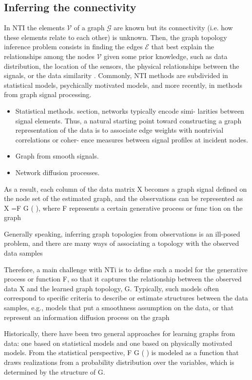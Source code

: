 \subsection{Inferring the connectivity}
\TODO
In NTI the elements $\mathcal{V}$ of a graph $\mathcal{G}$ are known but its connectivity (i.e. how these elements relate to each other) is unknown. Then, the graph topology inference problem consists in finding the edges $\mathcal{E}$ that best explain the relationships among the nodes $\mathcal{V}$ given some prior knowledge, such as  data distribution, the location of the sensors, the physical relationships between the signals, or the data similarity \cite{Dong2019Learninggraphsdata,Stankovic2019Introductiongraphsignal}. Commonly, NTI methods are subdivided in statistical models, psychically motivated models, and more recently, in methods from graph signal processing.  
\begin{itemize}
	\item Statistical methods. section, networks typically encode simi-
	larities between signal elements. Thus, a natural starting point
	toward constructing a graph representation of the data is to
	associate edge weights with nontrivial correlations or coher-
	ence measures between signal profiles at incident nodes. 
	\item Graph from smooth signals.
	\item Network diffusion processes.
\end{itemize}


As a result, each column of the data matrix X becomes a
graph signal defined on the node set of the estimated graph,
and the observations can be represented as X =F G ( ),
where F represents a certain generative process or func
tion on the graph

Generally speaking, inferring graph topologies from observations is an ill-posed problem, and there are many ways
of associating a topology with the observed data samples

Therefore, a main challenge with NTi is to define such a model for the generative process or
function F, so that it captures the relationship between the
observed data X and the learned graph topology, G. Typically, such models often correspond to specific criteria to
describe or estimate structures between the data samples, e.g.,
models that put a smoothness assumption on the data, or that
represent an information diffusion process on the graph


Historically, there have been two
general approaches for learning graphs
from data: one based on statistical
models and one based on physically
motivated models. From the statistical perspective, F G ( ) is modeled as a
function that draws realizations from a
probability distribution over the variables, which is determined by the structure of G. 

